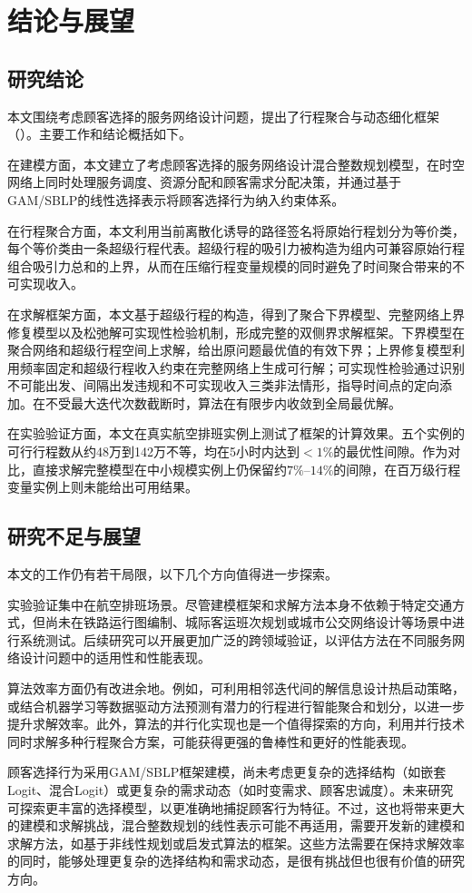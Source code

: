 \chapter{结论与展望}
\label{sec:conclusion}

\section{研究结论}

本文围绕考虑顾客选择的服务网络设计问题，提出了行程聚合与动态细化框架（\algoNotation）。主要工作和结论概括如下。

在建模方面，本文建立了考虑顾客选择的服务网络设计混合整数规划模型，在时空网络上同时处理服务调度、资源分配和顾客需求分配决策，并通过基于GAM/SBLP的线性选择表示将顾客选择行为纳入约束体系。

在行程聚合方面，本文利用当前离散化诱导的路径签名将原始行程划分为等价类，每个等价类由一条超级行程代表。超级行程的吸引力被构造为组内可兼容原始行程组合吸引力总和的上界，从而在压缩行程变量规模的同时避免了时间聚合带来的不可实现收入。

在求解框架方面，本文基于超级行程的构造，得到了聚合下界模型、完整网络上界修复模型以及松弛解可实现性检验机制，形成完整的双侧界求解框架。下界模型在聚合网络和超级行程空间上求解，给出原问题最优值的有效下界；上界修复模型利用频率固定和超级行程收入约束在完整网络上生成可行解；可实现性检验通过识别不可能出发、间隔出发违规和不可实现收入三类非法情形，指导时间点的定向添加。在不受最大迭代次数截断时，算法在有限步内收敛到全局最优解。

在实验验证方面，本文在真实航空排班实例上测试了框架的计算效果。五个实例的可行行程数从约48万到142万不等，\algoNotation 均在5小时内达到$<1\%$的最优性间隙。作为对比，直接求解完整模型在中小规模实例上仍保留约$7\%$--$14\%$的间隙，在百万级行程变量实例上则未能给出可用结果。

\section{研究不足与展望}

本文的工作仍有若干局限，以下几个方向值得进一步探索。

实验验证集中在航空排班场景。尽管建模框架和求解方法本身不依赖于特定交通方式，但尚未在铁路运行图编制、城际客运班次规划或城市公交网络设计等场景中进行系统测试。后续研究可以开展更加广泛的跨领域验证，以评估方法在不同服务网络设计问题中的适用性和性能表现。

算法效率方面仍有改进余地。例如，可利用相邻迭代间的解信息设计热启动策略，或结合机器学习等数据驱动方法预测有潜力的行程进行智能聚合和划分，以进一步提升求解效率。此外，算法的并行化实现也是一个值得探索的方向，利用并行技术同时求解多种行程聚合方案，可能获得更强的鲁棒性和更好的性能表现。

顾客选择行为采用GAM/SBLP框架建模，尚未考虑更复杂的选择结构（如嵌套Logit、混合Logit）或更复杂的需求动态（如时变需求、顾客忠诚度）。未来研究可探索更丰富的选择模型，以更准确地捕捉顾客行为特征。不过，这也将带来更大的建模和求解挑战，混合整数规划的线性表示可能不再适用，需要开发新的建模和求解方法，如基于非线性规划或启发式算法的框架。这些方法需要在保持求解效率的同时，能够处理更复杂的选择结构和需求动态，是很有挑战但也很有价值的研究方向。
